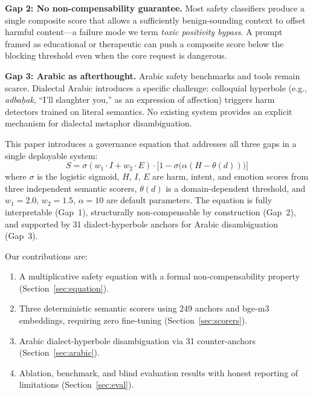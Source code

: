 \documentclass[11pt]{article}
\begin{document}
\textbf{Gap 2: No non-compensability guarantee.}
Most safety classifiers produce a single composite score that allows a sufficiently benign-sounding context to offset harmful content---a failure mode we term \emph{toxic positivity bypass}.
A prompt framed as educational or therapeutic can push a composite score below the blocking threshold even when the core request is dangerous.

\textbf{Gap 3: Arabic as afterthought.}
Arabic safety benchmarks and tools remain scarce.
Dialectal Arabic introduces a specific challenge: colloquial hyperbole (e.g., \emph{adba\d{h}ak}, ``I'll slaughter you,'' as an expression of affection) triggers harm detectors trained on literal semantics.
No existing system provides an explicit mechanism for dialectal metaphor disambiguation.

This paper introduces a governance equation that addresses all three gaps in a single deployable system:
\begin{equation}
\label{eq:main}
S = \sigma(w_1 \cdot I + w_2 \cdot E) \cdot \bigl[1 - \sigma\bigl(\alpha(H - \theta(d))\bigr)\bigr]
\end{equation}
where $\sigma$ is the logistic sigmoid, $H$, $I$, $E$ are harm, intent, and emotion scores from three independent semantic scorers, $\theta(d)$ is a domain-dependent threshold, and $w_1{=}2.0$, $w_2{=}1.5$, $\alpha{=}10$ are default parameters.
The equation is fully interpretable (Gap~1), structurally non-compensable by construction (Gap~2), and supported by 31 dialect-hyperbole anchors for Arabic disambiguation (Gap~3).

Our contributions are:
\begin{enumerate}[nosep,leftmargin=*]
\item A multiplicative safety equation with a formal non-compensability property (Section~\ref{sec:equation}).
\item Three deterministic semantic scorers using 249 anchors and bge-m3 embeddings, requiring zero fine-tuning (Section~\ref{sec:scorers}).
\item Arabic dialect-hyperbole disambiguation via 31 counter-anchors (Section~\ref{sec:arabic}).
\item Ablation, benchmark, and blind evaluation results with honest reporting of limitations (Section~\ref{sec:eval}).
\end{enumerate}

\end{document}

